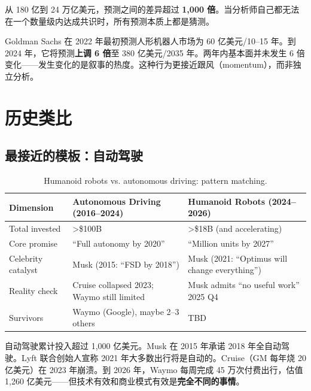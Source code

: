 从 180 亿到 24 万亿美元，预测之间的差异超过 \textbf{1,000 倍}\cite{gs2024humanoid,morgan2025humanoid100,ark2025humanoid}。当分析师自己都无法在一个数量级内达成共识时，所有预测本质上都是猜测。

\begin{whybox}
Goldman Sachs 在 2022 年最初预测人形机器人市场为 60 亿美元/10--15 年。到 2024 年，它将预测\textbf{上调 6 倍}至 380 亿美元/2035 年\cite{gs2024humanoid}。两年内基本面并未发生 6 倍变化——发生变化的是叙事的热度。这种行为更接近跟风（momentum），而非独立分析。
\end{whybox}

\section{历史类比}

\subsection{最接近的模板：自动驾驶}

\begin{table}[htbp]
\centering
\caption{Humanoid robots vs. autonomous driving: pattern matching.}
\label{tab:adparallel}
\begin{tabularx}{\textwidth}{lXX}
\toprule
\rowcolor{figLightGray}
\textbf{Dimension} & \textbf{Autonomous Driving (2016--2024)} & \textbf{Humanoid Robots (2024--2026)} \\
\midrule
Total invested & >\$100B & >\$18B (and accelerating) \\
Core promise & ``Full autonomy by 2020'' & ``Million units by 2027'' \\
Celebrity catalyst & Musk (2015: ``FSD by 2018'') & Musk (2021: ``Optimus will change everything'') \\
Reality check & Cruise collapsed 2023; Waymo still limited & Musk admits ``no useful work'' 2025 Q4 \\
Survivors & Waymo (Google), maybe 2--3 others & TBD \\
\bottomrule
\end{tabularx}
\end{table}

自动驾驶累计投入超过 1,000 亿美元\cite{bloomberg2022av}。Musk 在 2015 年承诺 2018 年全自动驾驶。Lyft 联合创始人宣称 2021 年大多数出行将是自动的。Cruise（GM 每年烧 20 亿美元）在 2023 年崩溃。到 2026 年，Waymo 每周完成 45 万次付费出行，估值 1,260 亿美元——但技术有效和商业模式有效是\textbf{完全不同的事情}\cite{waymo2026stats}。

